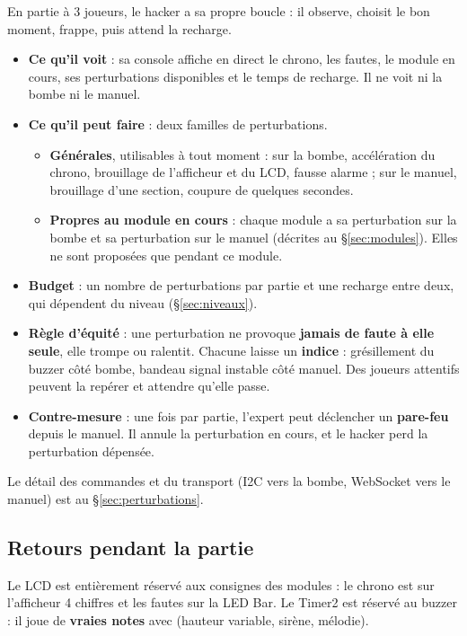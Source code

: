 \documentclass[11pt,a4paper]{article}
\newcommand{\code}[1]{\texttt{\detokenize{#1}}}
\begin{document}
En partie à 3 joueurs, le hacker a sa propre boucle : il observe, choisit le bon moment, frappe, puis attend la recharge.

\begin{itemize}
  \item \textbf{Ce qu'il voit} : sa console affiche en direct le chrono, les fautes, le module en cours, ses perturbations disponibles et le temps de recharge. Il ne voit ni la bombe ni le manuel.
  \item \textbf{Ce qu'il peut faire} : deux familles de perturbations.
  \begin{itemize}
    \item \textbf{Générales}, utilisables à tout moment : sur la bombe, accélération du chrono, brouillage de l'afficheur et du LCD, fausse alarme ; sur le manuel, brouillage d'une section, coupure de quelques secondes.
    \item \textbf{Propres au module en cours} : chaque module a sa perturbation sur la bombe et sa perturbation sur le manuel (décrites au \S\ref{sec:modules}). Elles ne sont proposées que pendant ce module.
  \end{itemize}
  \item \textbf{Budget} : un nombre de perturbations par partie et une recharge entre deux, qui dépendent du niveau (\S\ref{sec:niveaux}).
  \item \textbf{Règle d'équité} : une perturbation ne provoque \textbf{jamais de faute à elle seule}, elle trompe ou ralentit. Chacune laisse un \textbf{indice} : grésillement du buzzer côté bombe, bandeau \og signal instable\fg{} côté manuel. Des joueurs attentifs peuvent la repérer et attendre qu'elle passe.
  \item \textbf{Contre-mesure} : une fois par partie, l'expert peut déclencher un \textbf{pare-feu} depuis le manuel. Il annule la perturbation en cours, et le hacker perd la perturbation dépensée.
\end{itemize}

Le détail des commandes et du transport (I2C vers la bombe, WebSocket vers le manuel) est au \S\ref{sec:perturbations}.

\subsection{Retours pendant la partie}
\label{sec:retours}

Le LCD est entièrement réservé aux consignes des modules : le chrono est sur l'afficheur 4 chiffres et les fautes sur la LED Bar. Le Timer2 est réservé au buzzer : il joue de \textbf{vraies notes} avec \code{tone()} (hauteur variable, sirène, mélodie).
\end{document}
